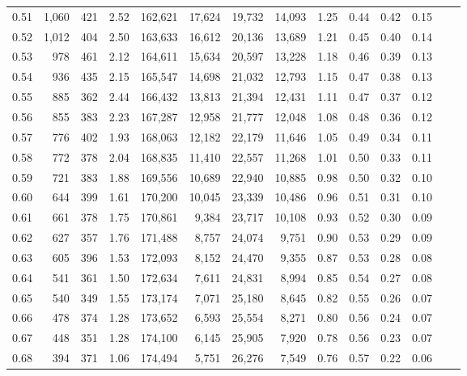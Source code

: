 \begin{tabular}{rrrrrrrrrrrrrr}
0.51 &  1,060 &  421 &    2.52 &  162,621 &   17,624 &  19,732 &  14,093 &  1.25 &  0.44 &  0.42 &      0.15 \\
0.52 &  1,012 &  404 &    2.50 &  163,633 &   16,612 &  20,136 &  13,689 &  1.21 &  0.45 &  0.40 &      0.14 \\
0.53 &    978 &  461 &    2.12 &  164,611 &   15,634 &  20,597 &  13,228 &  1.18 &  0.46 &  0.39 &      0.13 \\
0.54 &    936 &  435 &    2.15 &  165,547 &   14,698 &  21,032 &  12,793 &  1.15 &  0.47 &  0.38 &      0.13 \\
0.55 &    885 &  362 &    2.44 &  166,432 &   13,813 &  21,394 &  12,431 &  1.11 &  0.47 &  0.37 &      0.12 \\
0.56 &    855 &  383 &    2.23 &  167,287 &   12,958 &  21,777 &  12,048 &  1.08 &  0.48 &  0.36 &      0.12 \\
0.57 &    776 &  402 &    1.93 &  168,063 &   12,182 &  22,179 &  11,646 &  1.05 &  0.49 &  0.34 &      0.11 \\
0.58 &    772 &  378 &    2.04 &  168,835 &   11,410 &  22,557 &  11,268 &  1.01 &  0.50 &  0.33 &      0.11 \\
0.59 &    721 &  383 &    1.88 &  169,556 &   10,689 &  22,940 &  10,885 &  0.98 &  0.50 &  0.32 &      0.10 \\
0.60 &    644 &  399 &    1.61 &  170,200 &   10,045 &  23,339 &  10,486 &  0.96 &  0.51 &  0.31 &      0.10 \\
0.61 &    661 &  378 &    1.75 &  170,861 &    9,384 &  23,717 &  10,108 &  0.93 &  0.52 &  0.30 &      0.09 \\
0.62 &    627 &  357 &    1.76 &  171,488 &    8,757 &  24,074 &   9,751 &  0.90 &  0.53 &  0.29 &      0.09 \\
0.63 &    605 &  396 &    1.53 &  172,093 &    8,152 &  24,470 &   9,355 &  0.87 &  0.53 &  0.28 &      0.08 \\
0.64 &    541 &  361 &    1.50 &  172,634 &    7,611 &  24,831 &   8,994 &  0.85 &  0.54 &  0.27 &      0.08 \\
0.65 &    540 &  349 &    1.55 &  173,174 &    7,071 &  25,180 &   8,645 &  0.82 &  0.55 &  0.26 &      0.07 \\
0.66 &    478 &  374 &    1.28 &  173,652 &    6,593 &  25,554 &   8,271 &  0.80 &  0.56 &  0.24 &      0.07 \\
0.67 &    448 &  351 &    1.28 &  174,100 &    6,145 &  25,905 &   7,920 &  0.78 &  0.56 &  0.23 &      0.07 \\
0.68 &    394 &  371 &    1.06 &  174,494 &    5,751 &  26,276 &   7,549 &  0.76 &  0.57 &  0.22 &      0.06 \\

\end{tabular}
